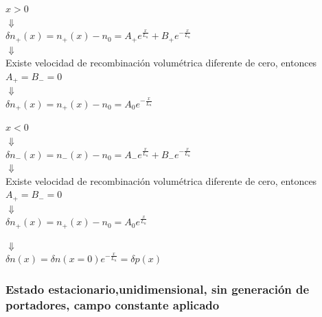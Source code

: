 \documentclass[oneside]{book}
\numberwithin{equation}{section}
\numberwithin{figure}{section}
\numberwithin{table}{section}
\begin{document}
					\begin{minipage}[t]{0.45\textwidth}
						\begin{center}
							$x>0$\\
							$\Downarrow$\\
							$\displaystyle \delta n_+(x)=n_+(x)-n_0=A_+ e^{\frac{x}{L_n}}+B_+ e^{-\frac{x}{L_n}}$\\
							$\Downarrow$\\
							Existe velocidad de recombinación volumétrica diferente de cero, entonces $A_+=B_-=0$\\
							$\Downarrow$\\
							$\displaystyle \delta n_+(x)=n_+(x)-n_0=A_0 e^{-\frac{x}{L_n}}$\\
						\end{center}
					\end{minipage}
					\begin{minipage}[t]{0.45\textwidth}
						\begin{center}
							$x<0$\\
							$\Downarrow$\\
							$\displaystyle \delta n_-(x)=n_-(x)-n_0=A_- e^{\frac{x}{L_n}}+B_- e^{-\frac{x}{L_n}}$\\
							$\Downarrow$\\
							Existe velocidad de recombinación volumétrica diferente de cero, entonces $A_+=B_-=0$\\
							$\Downarrow$\\
							$\displaystyle \delta n_+(x)=n_+(x)-n_0=A_0 e^{\frac{x}{L_n}}$\\
						\end{center}
					\end{minipage}
	
					\begin{center}
						$\Downarrow$\\
						$\displaystyle \delta n(x)=\delta n(x=0)e^{-\frac{x}{L_n}}=\delta p(x)$
					\end{center}
	
				\subsubsection{Estado estacionario,unidimensional, sin generación de portadores, campo constante aplicado}
	
\end{document}
